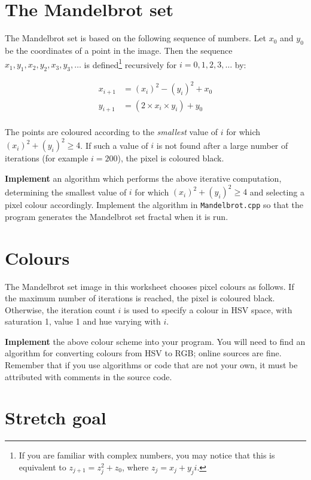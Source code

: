 \documentclass{../../fal_assignment}
\begin{document}
\section{The Mandelbrot set}

The Mandelbrot set is based on the following sequence of numbers. Let $x_0$ and $y_0$ be the coordinates of a point in the image.
Then the sequence $x_1, y_1, x_2, y_2, x_3, y_3, \dots$ is defined\footnote{%
    If you are familiar with complex numbers, you may notice that this is equivalent to $z_{j+1} = z_j^2 + z_0$, where $z_j = x_j + y_j i$.
} recursively for $i = 0, 1, 2, 3, \dots$ by:

\begin{align*}
    x_{i+1} &= (x_i)^2 - (y_i)^2 + x_0 \\
    y_{i+1} &= (2 \times x_i \times y_i) + y_0 \\
\end{align*}

The points are coloured according to the \emph{smallest} value of $i$ for which $(x_i)^2 + (y_i)^2 \geq 4$.
If such a value of $i$ is not found after a large number of iterations (for example $i=200$), the pixel is coloured black.

\textbf{Implement} an algorithm which performs the above iterative computation, determining the smallest value of $i$
for which $(x_i)^2 + (y_i)^2 \geq 4$ and selecting a pixel colour accordingly.
Implement the algorithm in \texttt{Mandelbrot.cpp} so that the program generates the Mandelbrot set fractal when it is run.

\section{Colours}

The Mandelbrot set image in this worksheet chooses pixel colours as follows.
If the maximum number of iterations is reached, the pixel is coloured black.
Otherwise, the iteration count $i$ is used to specify a colour in HSV space,
with saturation 1, value 1 and hue varying with $i$.

\textbf{Implement} the above colour scheme into your program.
You will need to find an algorithm for converting colours from HSV to RGB;
online sources are fine.
Remember that if you use algorithms or code that are not your own,
it must be attributed with comments in the source code.

\section{Stretch goal}
\end{document}
